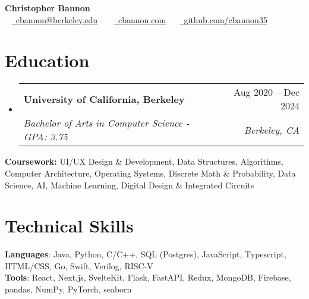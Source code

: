 \documentclass[letterpaper,11pt]{article}
\makeatletter
\newcommand{\resumeSubheading}[4]{
  \vspace{-2pt}\item
    \begin{tabular*}{0.97\textwidth}[t]{l@{\extracolsep{\fill}}r}
      \textbf{#1} & #2 \\
      \textit{\small#3} & \textit{\small #4} \\
    \end{tabular*}\vspace{-6pt}
}
\newcommand{\resumeSubHeadingListStart}{\begin{itemize}[leftmargin=0.15in, label={}]}
\newcommand{\resumeSubHeadingListEnd}{\end{itemize}}
\makeatother
\begin{document}
\begin{center}
    {\Huge \textbf{Christopher Bannon}} \\ \vspace{6pt}
    ~ \small \href{mailto:cbannon@berkeley.edu}{\raisebox{-0.2\height}\faEnvelope\  \underline{cbannon@berkeley.edu}} ~
    ~ \small \href{https://cbannon.com}{\raisebox{-0.2\height}\faLink\ \underline{cbannon.com}} ~
    ~\href{https://github.com/cbannon35}{\raisebox{-0.2\height}\faGithub\ \underline{github.com/cbannon35}}~
    \vspace{-8pt}
\end{center}


\section{Education}
  \resumeSubHeadingListStart
    \resumeSubheading
      {University of California, Berkeley}{Aug 2020 -- Dec 2024}
      {Bachelor of Arts in Computer Science - GPA: 3.75}{Berkeley, CA}
  \resumeSubHeadingListEnd
  \begin{itemize}[leftmargin=0.15in, label={}]
    \small{\item{\textbf{Coursework:} UI/UX Design \& Development, Data Structures, Algorithms, Computer Architecture, Operating Systems, Discrete Math \& Probability, Data Science, AI, Machine Learning, Digital Design \& Integrated Circuits
    }}
  \end{itemize}

\section{Technical Skills}
\begin{itemize}[leftmargin=0.15in, label={}]
   \small{\item{
    \textbf{Languages}{: Java, Python, C/C++, SQL (Postgres), JavaScript, Typescript, HTML/CSS, Go, Swift, Verilog, RISC-V} \\
    \textbf{Tools}{: React, Next.js, SvelteKit, Flask, FastAPI, Redux, MongoDB, Firebase, pandas, NumPy, PyTorch, seaborn} \\
   }}
\end{itemize}
\end{document}
